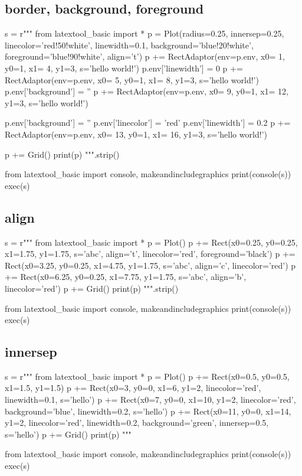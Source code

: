 \newpage
\subsection{border, background, foreground}

\begin{python}
s = r"""
from latextool_basic import *
p = Plot(radius=0.25, innersep=0.25,
         linecolor='red!50!white', linewidth=0.1,
         background='blue!20!white', foreground='blue!90!white', 
         align='t')
p += RectAdaptor(env=p.env, x0= 1, y0=1, x1= 4, y1=3, s='hello world!')
p.env['linewidth'] = 0
p += RectAdaptor(env=p.env, x0= 5, y0=1, x1= 8, y1=3, s='hello world!')
p.env['background'] = ''
p += RectAdaptor(env=p.env, x0= 9, y0=1, x1= 12, y1=3, s='hello world!')

p.env['background'] = ''
p.env['linecolor'] = 'red'
p.env['linewidth'] = 0.2
p += RectAdaptor(env=p.env, x0= 13, y0=1, x1= 16, y1=3, s='hello world!')

p += Grid()
print(p)
""".strip()

from latextool_basic import console, makeandincludegraphics
print(console(s))
exec(s)
\end{python}




\newpage
\subsection{align}
\begin{python}
s = r"""
from latextool_basic import *
p = Plot()
p += Rect(x0=0.25, y0=0.25, x1=1.75, y1=1.75, s='abc', align='t', 
          linecolor='red', foreground='black')
p += Rect(x0=3.25, y0=0.25, x1=4.75, y1=1.75, s='abc', align='c', 
          linecolor='red')
p += Rect(x0=6.25, y0=0.25, x1=7.75, y1=1.75, s='abc', align='b', 
          linecolor='red')
p += Grid()
print(p)
""".strip()

from latextool_basic import console, makeandincludegraphics
print(console(s))
exec(s)
\end{python}



\newpage
\subsection{innersep}
\begin{python}
s = r"""
from latextool_basic import *
p = Plot()
p += Rect(x0=0.5, y0=0.5, x1=1.5, y1=1.5)
p += Rect(x0=3, y0=0, x1=6, y1=2, linecolor='red', linewidth=0.1, s='hello')
p += Rect(x0=7, y0=0, x1=10, y1=2, linecolor='red', background='blue', 
          linewidth=0.2, s='hello')
p += Rect(x0=11, y0=0, x1=14, y1=2, linecolor='red', linewidth=0.2,
          background='green',
          innersep=0.5, s='hello')
p += Grid()
print(p)
"""

from latextool_basic import console, makeandincludegraphics
print(console(s))
exec(s)
\end{python}





